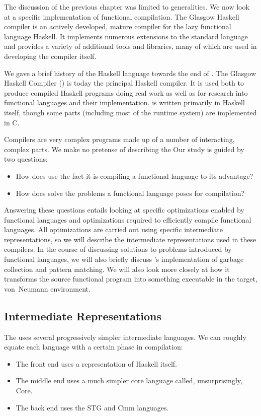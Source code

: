 \label{casestudy}
The discussion of the previous chapter was limited to generalities. We now look at a specific implementation of functional compilation. The Glasgow Haskell compiler is an actively developed, mature compiler for the lazy functional language Haskell. It implements numerous extensions to the standard language and provides a variety of additional tools and libraries, many of which are used in developing the compiler itself.

We gave a brief history of the Haskell language towards the end of . The Glasgow Haskell Compiler (\GHC{}) is today the principal Haskell compiler. It is used both to produce compiled Haskell programs doing real work as well as for research into functional languages and their implementation. \GHC is written primarily in Haskell itself, though some parts (including most of the runtime system) are implemented in C.

Compilers are very complex programs made up of a number of interacting, complex parts. We make no pretense of describing the \GHC[long]  Our study is guided by two questions:
\begin{itemize}
\item
How does \GHC use the fact it is compiling a functional language to its advantage?

\item
How does \GHC solve the problems a functional language poses for compilation?
\end{itemize}

Answering these questions entails looking at specific optimizations enabled by functional languages and optimizations required to efficiently compile functional languages. All optimizations are carried out using specific intermediate representations, so we will describe the intermediate representations used in these compilers. In the course of discussing solutions to problems introduced by functional languages, we will also briefly discuss \GHC{}'s implementation of garbage collection and pattern matching. We will also look more closely at how it transforms the source functional program into something executable in the target, von~Neumann environment.

\subsection{Intermediate Representations}
The \GHC[long] uses several progressively simpler intermediate languages. We can roughly equate each language with a certain phase in compilation:
\begin{itemize}
\item
The front end uses a representation of Haskell itself.

\item
The middle end uses a much simpler core language called, unsurprisingly, Core.

\item
The back end uses the STG and Cmm languages.
\end{itemize}

